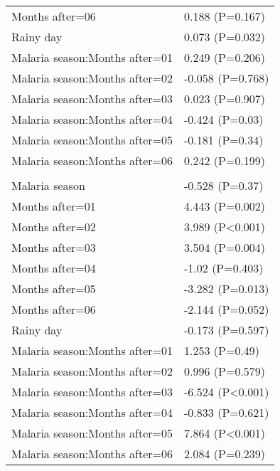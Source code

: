 \documentclass[]{article}
\begin{document}
\begin{longtable}[t]{ll}
\hspace{1em}Months after=06 & 0.188 (P=0.167)\\
\hspace{1em}Rainy day & 0.073 (P=0.032)\\
\hspace{1em}Malaria season:Months after=01 & 0.249 (P=0.206)\\
\hspace{1em}Malaria season:Months after=02 & -0.058 (P=0.768)\\
\hspace{1em}Malaria season:Months after=03 & 0.023 (P=0.907)\\
\hspace{1em}Malaria season:Months after=04 & -0.424 (P=0.03)\\
\hspace{1em}Malaria season:Months after=05 & -0.181 (P=0.34)\\
\hspace{1em}Malaria season:Months after=06 & 0.242 (P=0.199)\\
\addlinespace[1.5em]
\multicolumn{2}{l}{\textbf{Temporary not field worker}}\\
\hspace{1em}Malaria season & -0.528 (P=0.37)\\
\hspace{1em}Months after=01 & 4.443 (P=0.002)\\
\hspace{1em}Months after=02 & 3.989 (P<0.001)\\
\hspace{1em}Months after=03 & 3.504 (P=0.004)\\
\hspace{1em}Months after=04 & -1.02 (P=0.403)\\
\hspace{1em}Months after=05 & -3.282 (P=0.013)\\
\hspace{1em}Months after=06 & -2.144 (P=0.052)\\
\hspace{1em}Rainy day & -0.173 (P=0.597)\\
\hspace{1em}Malaria season:Months after=01 & 1.253 (P=0.49)\\
\hspace{1em}Malaria season:Months after=02 & 0.996 (P=0.579)\\
\hspace{1em}Malaria season:Months after=03 & -6.524 (P<0.001)\\
\hspace{1em}Malaria season:Months after=04 & -0.833 (P=0.621)\\
\hspace{1em}Malaria season:Months after=05 & 7.864 (P<0.001)\\
\hspace{1em}Malaria season:Months after=06 & 2.084 (P=0.239)\\*
\end{longtable}
\end{document}
